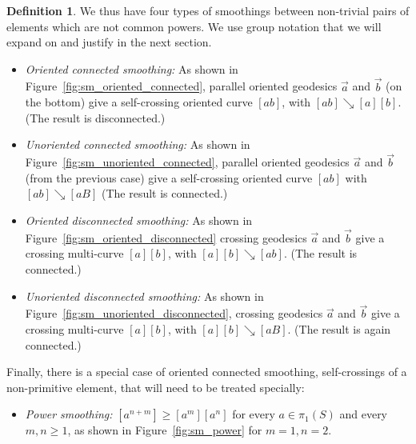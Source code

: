 \documentclass[11pt]{amsart}
\newcommand{\ora}[1]{\overrightarrow{#1}}
\numberwithin{equation}{section}
\numberwithin{figure}{section}
\theoremstyle{definition}
\newtheorem{definition}[theorem]{Definition}
\theoremstyle{plain}
\newcommand{\reducesto}{\mathrel{\searrow}}
\begin{document}
\begin{definition}
  We thus have four types 
  of smoothings between non-trivial pairs of elements which are not
  common powers. We use group notation that we will expand on and justify
  in the next section.
  \begin{itemize}
  \item \emph{Oriented connected smoothing:} As shown in
    Figure~\ref{fig:sm_oriented_connected}, parallel oriented geodesics
    $\ora{a}$ and $\ora{b}$ (on the bottom) give a self-crossing oriented
    curve $[ab]$, with $[ab] \reducesto [a][b]$. (The result is
    disconnected.)
  \item \emph{Unoriented connected smoothing:}
    As shown in
    Figure~\ref{fig:sm_unoriented_connected}, parallel oriented geodesics
    $\ora{a}$ and $\ora{b}$ (from the previous case) give a
    self-crossing oriented curve $[ab]$ with
    $[ab] \reducesto [aB]$ (The result is
    connected.)
  \item \emph{Oriented disconnected smoothing:} As shown in
    Figure~\ref{fig:sm_oriented_disconnected}
 crossing geodesics $\ora{a}$ and $\ora{b}$ give a crossing
 multi-curve $[a][b]$, with $[a][b] \reducesto [ab]$. (The result is connected.)
  \item \emph{Unoriented disconnected smoothing:} As shown in
    Figure~\ref{fig:sm_unoriented_disconnected}, crossing geodesics
    $\ora{a}$ and $\ora{b}$ give a crossing multi-curve
    $[a][b]$, with $[a][b] \reducesto [aB]$. (The result is again connected.)
  \end{itemize}
  Finally, there is a special case of oriented connected smoothing,
  self-crossings of a non-primitive element, that will need to be treated
  specially:
  \begin{itemize}
  \item \emph{Power smoothing:}
    $[a^{n+m}] \geq [a^m][a^n]$ for every $a \in \pi_1(S)$ and every
    $m,n \geq 1$, as shown in Figure~\ref{fig:sm_power} for $m=1,n=2$.
  \end{itemize}
\end{definition}
\end{document}
